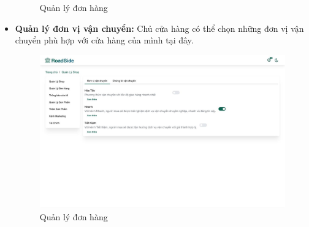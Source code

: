 \begin{itemize}
\begin{figure}[H]
            \vspace{1em}
            \caption{Quản lý đơn hàng}
        \end{figure}
    \item \textbf{Quản lý đơn vị vận chuyển:} Chủ cửa hàng có thể chọn những đơn vị vận chuyển phù hợp với cửa hàng của mình tại đây.
        \begin{figure}[H]
            \centering
            \includegraphics[width=\linewidth] {Images/UI/shop_shipping.png}
            \vspace{1em}
            \caption{Quản lý đơn hàng}
        \end{figure}
\end{itemize}

